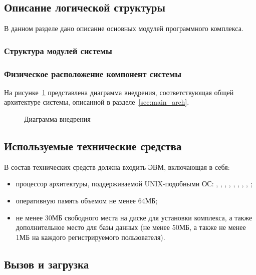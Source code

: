\subsection{Описание логической структуры}

В данном разделе дано описание основных модулей программного комплекса.

\subsubsection*{Структура модулей системы}



\subsubsection*{Физическое расположение компонент системы}

На рисунке~\ref{fig:deployment} представлена диаграмма внедрения,
соответствующая общей архитектуре системы, описанной в
разделе~\ref{sec:main_arch}.

\begin{figure}
    \caption{Диаграмма внедрения}
    \label{fig:deployment}
\end{figure}


\subsection{Используемые технические средства}
\label{sec:soft_description:tech}

В состав технических средств должна входить ЭВМ, включающая в себя:
\begin{itemize}
    \item процессор архитектуры, поддерживаемой UNIX-подобными ОС: , , , , , , , , ;
    \item оперативную память объемом не менее 64МБ;
    \item не менее 30МБ свободного места на диске для установки комплекса, а также дополнительное место для базы данных (не менее 50МБ, а также не менее 1МБ на каждого регистрируемого пользователя).
\end{itemize}

\subsection{Вызов и загрузка}

